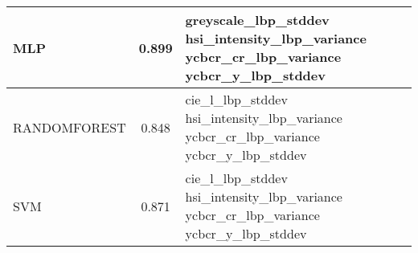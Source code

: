 \begin{longtable}{lcll}
\midrule
         MLP & 0.899 & \begin{minipage}[t]{0.5\textwidth}greyscale\_lbp\_stddev hsi\_intensity\_lbp\_variance ycbcr\_cr\_lbp\_variance ycbcr\_y\_lbp\_stddev  \end{minipage}\\
\midrule
RANDOMFOREST & 0.848 &  \begin{minipage}[t]{0.5\textwidth}   cie\_l\_lbp\_stddev hsi\_intensity\_lbp\_variance ycbcr\_cr\_lbp\_variance ycbcr\_y\_lbp\_stddev  \end{minipage}\\
\midrule
         SVM & 0.871 &  \begin{minipage}[t]{0.5\textwidth}   cie\_l\_lbp\_stddev hsi\_intensity\_lbp\_variance ycbcr\_cr\_lbp\_variance ycbcr\_y\_lbp\_stddev  \end{minipage}\\
\end{longtable}
